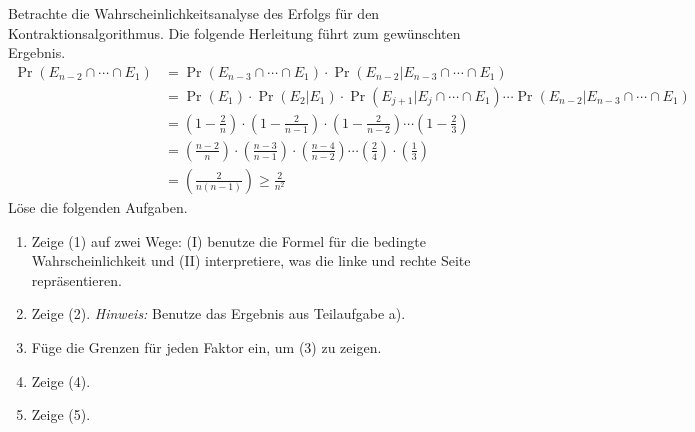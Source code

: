 \documentclass{uebung_cs}
\begin{document}
\begin{aufgabe}
	Betrachte die Wahrscheinlichkeitsanalyse des Erfolgs für den Kontraktionsalgorithmus. Die folgende Herleitung führt zum gewünschten Ergebnis.
	\begin{align}
	\Pr(E_{n-2} \cap \cdots \cap E_1) &= \Pr(E_{n-3} \cap \cdots \cap E_1) \cdot \Pr(E_{n-2}|E_{n-3} \cap \cdots \cap E_1) \\
	&= \Pr(E_1) \cdot \Pr(E_2|E_1) \cdot \Pr(E_{j+1} | E_j \cap \cdots \cap E_1) \cdots \Pr(E_{n-2} | E_{n-3} \cap \cdots \cap E_1) \\
	&= \left(1 - \frac{2}{n} \right) \cdot \left(1 - \frac{2}{n-1} \right) \cdot \left(1 - \frac{2}{n-2} \right) \cdots \left(1 - \frac{2}{3} \right) \\
	&= \left(\frac{n-2}{n}\right) \cdot \left(\frac{n-3}{n-1}\right) \cdot \left(\frac{n-4}{n-2}\right) \cdots \left(\frac{2}{4}\right) \cdot \left(\frac{1}{3}\right) \\
	&= \left(\frac{2}{n(n-1)}\right) \geq \frac{2}{n^2}
	\end{align}
	Löse die folgenden Aufgaben.
	\begin{enumerate}
		\item Zeige (1) auf zwei Wege: (I) benutze die Formel für die bedingte Wahrscheinlichkeit und (II) interpretiere, was die linke und rechte Seite repräsentieren. \\
		\item Zeige (2). \textit{Hinweis:} Benutze das Ergebnis aus Teilaufgabe a). \\
		\item Füge die Grenzen für jeden Faktor ein, um (3) zu zeigen. \\
		\item Zeige (4). \\
		\item Zeige (5).
	\end{enumerate}
\end{aufgabe}
\end{document}
